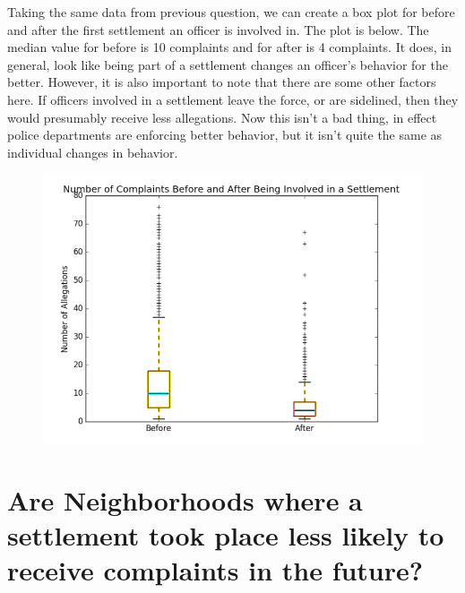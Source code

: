 \documentclass{article}
\begin{document}
Taking the same data from previous question, we can create a box plot for before and after the first settlement an officer is involved in. The plot is below. The median value for before is 10 complaints and for after is 4 complaints. It does, in general, look like being part of a settlement changes an officer's behavior for the better. However, it is also important to note that there are some other factors here. If officers involved in a settlement leave the force, or are sidelined, then they would presumably receive less allegations. Now this isn't a bad thing, in effect police departments are enforcing better behavior, but it isn't quite the same as individual changes in behavior.

\begin{figure}[h!]
\centering
\includegraphics[width=\textwidth]{settb.png}
\end{figure}

\FloatBarrier


\section{Are Neighborhoods where a settlement took place less likely to receive complaints in the future?}
\end{document}
